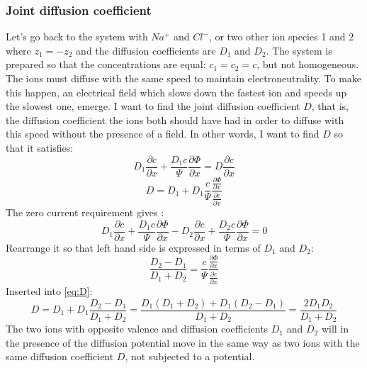 \documentclass{article}
\begin{document}
\subsubsection{Joint diffusion coefficient}\label{joint diffusion}
Let's go back to the system with $Na^+$ and $Cl^-$, or two other ion species 1 and 2 where $z_1 = -z_2$ and the diffusion coefficients are $D_1$ and $D_2$. The system is prepared so that the concentrations are equal: $c_1 = c_2=c$, but not homogeneous. The ions must diffuse with the same speed to maintain electroneutrality. To make this happen, an electrical field which slows down the fastest ion and speeds up the slowest one, emerge.  I want to find the joint diffusion coefficient $D$, that is, the diffusion coefficient the ions both should have had in order to diffuse with this speed without the presence of a field. In other words, I want to find $D$ so that it satisfies:
\begin{equation}
D_1 \frac{\partial c}{\partial x} + \frac{D_1 c}{\Psi}\frac{\partial \Phi}{\partial x} = D\frac{\partial c}{\partial x}
\end{equation} 
\begin{equation}\label{eq:D}
D = D_1 + D_1 \frac{c}{\Psi}\frac{\frac{\partial \Phi}{\partial x}}{\frac{\partial c}{\partial x}}
\end{equation}
The zero current requirement gives :
\begin{equation}
D_1 \frac{\partial c}{\partial x} + \frac{D_1 c}{\Psi}\frac{\partial \Phi}{\partial x} - D_2 \frac{\partial c}{\partial x} + \frac{D_2 c}{\Psi}\frac{\partial \Phi}{\partial x} = 0
\end{equation}
Rearrange it so that left hand side is expressed in terms of $D_1$ and $D_2$:
\begin{equation}
\frac{D_2 - D_1}{D_1 + D_2} = \frac{c}{\Psi}\frac{\frac{\partial \Phi}{\partial x}}{\frac{\partial c}{\partial x}}
\end{equation}
Inserted into \ref{eq:D}: 
\begin{equation}
D = D_1 +D_1 \frac{D_2 - D_1}{D_1 + D_2} = \frac{D_1(D_1 + D_2)+D_1(D_2-D_1)}{D_1+D_2} = \frac{2D_1D_2}{D_1+D_2}
\end{equation}
The two ions with opposite valence and diffusion coefficients $D_1$ and $D_2$ will in the presence of the diffusion potential move in the same way as two ions with the same diffusion coefficient $D$, not subjected to a potential. 
\end{document}
